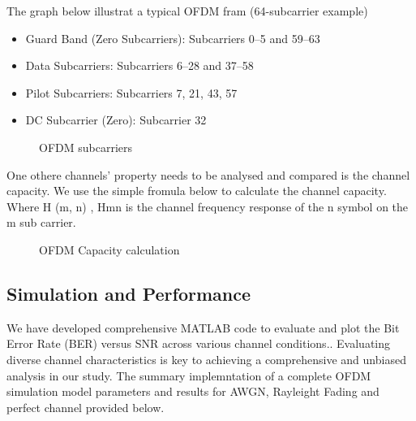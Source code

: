 \documentclass[conference]{IEEEtran}
\begin{document}
\begin{enumerate}
      The graph below illustrat a typical OFDM fram (64-subcarrier example)
      
      	\begin{itemize}
      	\item Guard Band (Zero Subcarriers): Subcarriers 0–5 and 59–63
	\item Data Subcarriers: Subcarriers 6–28 and 37–58
	\item Pilot Subcarriers: Subcarriers 7, 21, 43, 57
	\item DC Subcarrier (Zero): Subcarrier 32
	\end{itemize}

	\begin{figure}[H]
	    		\centering
	    		\caption{OFDM subcarriers}
		\end{figure}
		
One othere channels' property needs to be analysed and compared is the channel capacity. We use the simple fromula below to calculate the channel capacity. 
Where H (m, n) , Hmn is the channel frequency response of the n symbol on the m sub carrier. 
	
	\begin{figure}[H]
	    		\centering
	    		\caption{OFDM Capacity calculation}
		\end{figure}

\subsection {Simulation and Performance}
      
      We have developed comprehensive MATLAB code to evaluate and plot the Bit Error Rate (BER) versus SNR across various channel conditions.. Evaluating diverse channel characteristics is key to achieving a comprehensive and unbiased analysis in our study. The summary implemntation of a complete OFDM simulation model parameters and results for AWGN, Rayleight Fading and perfect channel provided below. 
      

\end{enumerate}
\end{document}
